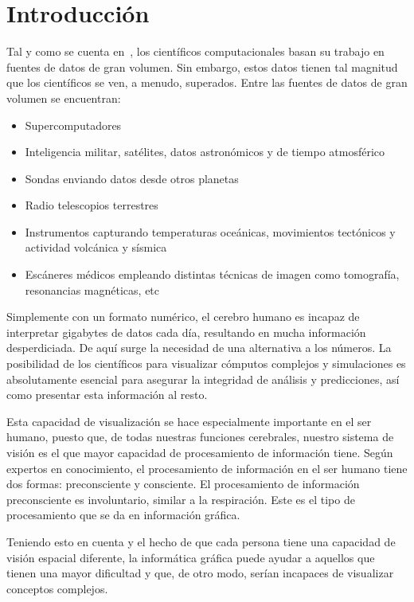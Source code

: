 \cleardoublepage

\chapter{Introducción}
\label{makereference}

Tal y como se cuenta en~\citet{DEFANTI1991247}, los científicos computacionales
basan su trabajo en fuentes de datos de gran volumen. Sin embargo, estos datos
tienen tal magnitud que los científicos se ven, a menudo, superados. Entre las
fuentes de datos de gran volumen se encuentran:

\begin{itemize}
		\item Supercomputadores
		\item Inteligencia militar, satélites, datos astronómicos y de tiempo atmosférico
		\item Sondas enviando datos desde otros planetas
		\item Radio telescopios terrestres
		\item Instrumentos capturando temperaturas oceánicas, movimientos tectónicos y 
				actividad volcánica y sísmica
		\item Escáneres médicos empleando distintas técnicas de imagen como tomografía, 
				resonancias magnéticas, etc
\end{itemize}

Simplemente con un formato numérico, el cerebro humano es incapaz de interpretar
gigabytes de datos cada día, resultando en mucha información desperdiciada. De
aquí surge la necesidad de una alternativa a los números. La posibilidad de los
científicos para visualizar cómputos complejos y simulaciones es absolutamente
esencial para asegurar la integridad de análisis y predicciones, así como
presentar esta información al resto.

Esta capacidad de visualización se hace especialmente importante en el ser
humano, puesto que, de todas nuestras funciones cerebrales, nuestro sistema de
visión es el que mayor capacidad de procesamiento de información tiene. Según
expertos en conocimiento, el procesamiento de información en el ser humano tiene
dos formas: preconsciente y consciente. El procesamiento de información
preconsciente es involuntario, similar a la respiración. Este es el tipo de
procesamiento que se da en información gráfica.
~\citet{Rohrer:2000:SBI:510378.510552}

Teniendo esto en cuenta y el hecho de que cada persona tiene una capacidad de
visión espacial diferente, la informática gráfica puede ayudar a aquellos que
tienen una mayor dificultad y que, de otro modo, serían incapaces de visualizar
conceptos complejos.

